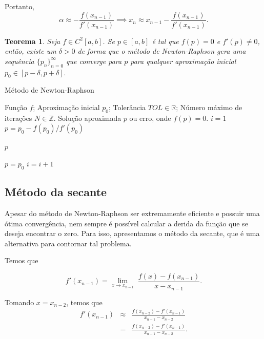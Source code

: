 \documentclass[a4paper, 10pt]{article} %
\newcommand{\R}{\mathbb{R}}
\newcommand{\Z}{\mathbb{Z}}
\newcommand{\limit}[3]{\underset{#1\rightarrow #2}{\lim}{\;#3}}
\newtheorem{teo}{Teorema}[section]
\theoremstyle{definition}
\theoremstyle{definition}
\numberwithin{equation}{section} %
\numberwithin{lstlisting}{section}
\numberwithin{algorithm}{section}
\numberwithin{table}{section}
\begin{document}
Portanto, 
\begin{equation}\label{eq:newton}
 \alpha \approx - \frac{f(x_{n-1})}{f'(x_{n-1})} \implies x_{n} \approx x_{n-1} - \frac{f(x_{n-1})}{f'(x_{n-1})}\text{.}
\end{equation}

\begin{teo}\label{teo:convergencia_p0_newtonraphson}
 Seja $f \in C^2[a, b]$. Se $p \in [a, b]$ é tal que $f(p) = 0$ e $f'(p) \neq 0$, então, existe um $\delta > 0$ de forma que o método de Newton-Raphson gera uma sequência $\{p_n\}_{n = 0}^{\infty}$ que converge para $p$ para qualquer aproximação inicial $p_0 \in [p - \delta, p + \delta]\text{.}$
\end{teo}


\begin{algorithm}[H]
  \caption{Método de Newton-Raphson}
  \begin{algorithmic}[1]
   \Require Função $f$; Aproximação inicial $p_0$; Tolerância $TOL \in \R$; Número máximo de iterações $N \in \Z$.
   \Ensure Solução aproximada $p$ ou erro, onde $f(p) = 0$.
    \State $i=1$
      \State $p = p_0 - f(p_0)/f'(p_0)$
      
	\State \Return $p$
      \EndIf
      
      \State $p = p_0$
      \State $i = i+1$

    \EndWhile
    \State {}
   \EndFunction
  \end{algorithmic}
 \end{algorithm}

\subsection{Método da secante}

Apesar do método de Newton-Raphson ser extremamente eficiente e possuir uma ótima convergência, nem sempre é possível calcular a derida da função que se deseja encontrar o zero. Para isso, apresentamos o método da secante, que é uma alternativa para contornar tal problema.

Temos que

\[f'(x_{n -1}) = \limit{x}{x_{n-1}}{\frac{f(x) - f(x_{n -1})}{x - x_{n-1}}}.\]

Tomando $x = x_{n-2}$, temos que 
\begin{eqnarray*}
f'(x_{n-1}) & \approx & \frac{f(x_{n-2})- f'(x_{n-1})}{x_{n-1} - x_{n-2}} \\ 
	    & = & \frac{f(x_{n-2})- f'(x_{n-1})}{x_{n-1} - x_{n-2}}\text{.}
\end{eqnarray*}
\end{document}
